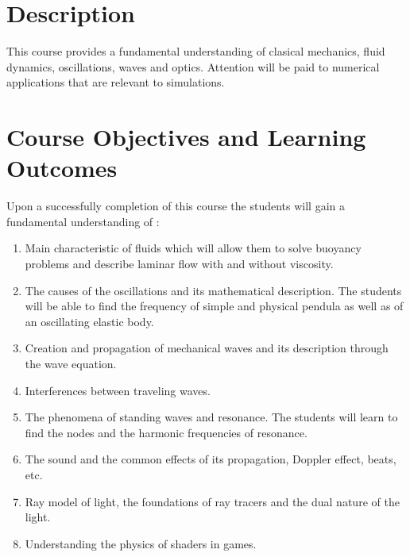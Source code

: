 \documentclass[12pt]{article}
\begin{document}



\section*{Description}

This  course provides a fundamental understanding of 
clasical mechanics, fluid dynamics, oscillations, waves and optics. 
Attention will be paid to numerical applications that are relevant to simulations.  




\section*{Course Objectives and Learning Outcomes }
Upon a successfully completion of this course the students will gain a fundamental understanding of :

\begin{enumerate}
\item  Main characteristic of fluids which will allow them to solve buoyancy problems and describe laminar flow with and without viscosity.
\item  The causes of the oscillations and its mathematical description. The students will be able to find the frequency of simple and physical pendula 
as well as of an oscillating elastic body.
\item  Creation and propagation of mechanical waves and its description through the wave equation.
\item  Interferences between traveling waves. 
\item  The phenomena of standing waves and resonance. The students will learn to find the nodes and the harmonic frequencies of resonance. 
\item The sound and the common effects of its propagation, Doppler effect, beats, etc.
\item  Ray model of light, the foundations of ray tracers and the dual nature of the light.
\item Understanding the physics of shaders in games. 
\end{enumerate}
\end{document}
